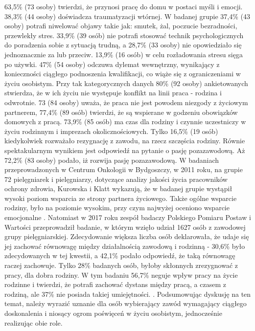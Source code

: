 \documentclass[a4paper,12pt,twoside,openany]{report}
\begin{document}
  63,5\%  (73 osoby) twierdzi, że przynosi pracę do domu w postaci myśli i emocji. 38,3\% (44 osoby) doświadcza traumatyzacji wtórnej. W badanej grupie 37,4\%  (43 osoby) potrafi niwelować objawy takie jak: smutek, żal, poczucie bezradności, przewlekły stres. 33,9\%  (39 osób) nie potrafi stosować technik psychologicznych do poradzenia sobie z sytuacją trudną, a 28,7\%  (33 osoby) nie opowiedziało się jednoznacznie za lub przeciw. 13,9\% (16 osób) w celu rozładowania stresu sięga po używki. 47\% (54 osoby) odczuwa dylemat wewnętrzny, wynikający z konieczności ciągłego podnoszenia kwalifikacji, co wiąże się z ograniczeniami w życiu osobistym. Przy tak kategorycznych danych 80\% (92 osoby) ankietowanych stwierdza, że w ich życiu nie występuje konflikt na linii praca - rodzina i odwrotnie. 73 (84 osoby) uważa, że praca nie jest powodem niezgody z życiowym partnerem, 77,4\%  (89 osób) twierdzi, że są wspierane w godzeniu obowiązków domowych z pracą. 73,9\% (85 osób) ma czas dla rodziny i czynnie uczestniczy w życiu rodzinnym i imprezach okolicznościowych. Tylko 16,5\% (19 osób) kiedykolwiek rozważało rezygnację z zawodu, na rzecz szczęścia rodziny. Równie spektakularnym wynikiem jest odpowiedź na pytanie o pasję pozazawodową. Aż 72,2\% (83 osoby) podało, iż rozwija pasję pozazawodową.  W badaniach  przeprowadzonych w Centrum Onkologii w Bydgoszczy, w 2011 roku, na grupie 72 pielęgniarek i pielęgniarzy, dotyczące analizy jakości życia pracowników ochrony zdrowia, Kurowska i Klatt  wykazują, że w badanej grupie wystąpił wysoki poziom wsparcia ze strony partnera życiowego. Także ogólne wsparcie rodziny, było na poziomie wysokim, przy czym najwyżej oceniono wsparcie emocjonalne \cite{ poziom}. Natomiast w 2017 roku zespół badaczy Polskiego Pomiaru Postaw i Wartości przeprowadził badanie, w którym wzięło udział 1627 osób z zawodowej grupy pielęgniarskiej. Zdecydowanie większa liczba osób deklarowała, że udaje się jej zachować równowagę między działalnością zawodową i rodzinną - 30,6\% było zdecydowanych w tej kwestii, a 42,1\% podało odpowiedź, że taką równowagę raczej zachowuje. Tylko 28\% badanych osób, byłoby skłonnych zrezygnować z pracy, dla dobra rodziny. W tym badaniu  56,7\% neguje wpływ pracy na życie rodzinne i twierdzi, że potrafi zachować dystans między pracą, a czasem z rodziną, ale 37\% nie posiada takiej umiejętności. \cite{komunikat}.
Podsumowując dyskusję na ten temat, należy wyrazić uznanie dla osób wybierający zawód wymagający ciągłego doskonalenia i niosący ogrom poświęceń w życiu osobistym, jednocześnie realizując obie role.
\end{document}
